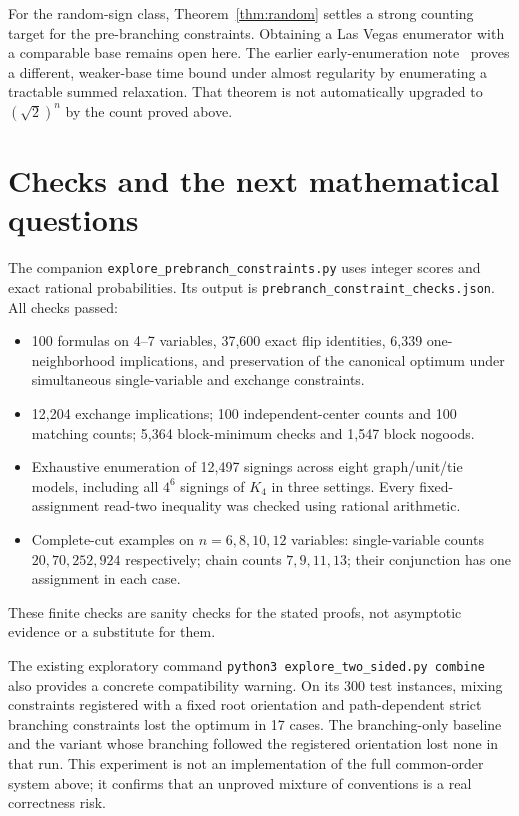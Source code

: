 \documentclass[11pt,a4paper]{article}
\theoremstyle{remark}
\begin{document}
For the random-sign class, Theorem~\ref{thm:random} settles a strong
counting target for the pre-branching constraints. Obtaining a Las Vegas
enumerator with a comparable base remains open here. The earlier
early-enumeration note~\cite{Early} proves a different, weaker-base time
bound under almost regularity by enumerating a tractable summed
relaxation. That theorem is not automatically upgraded to $(\sqrt2)^n$
by the count proved above.

\section{Checks and the next mathematical questions}

The companion \texttt{explore\_prebranch\_constraints.py} uses integer
scores and exact rational probabilities. Its output is
\texttt{prebranch\_constraint\_checks.json}. All checks passed:
\begin{itemize}
\item 100 formulas on 4--7 variables, 37,600 exact flip identities,
6,339 one-neighborhood implications, and preservation of the canonical
optimum under simultaneous single-variable and exchange constraints.
\item 12,204 exchange implications; 100 independent-center counts and
100 matching counts; 5,364 block-minimum checks and 1,547 block nogoods.
\item Exhaustive enumeration of 12,497 signings across eight graph/unit/tie
models, including all $4^6$ signings of $K_4$ in three settings. Every
fixed-assignment read-two inequality was checked using rational arithmetic.
\item Complete-cut examples on $n=6,8,10,12$ variables: single-variable
counts $20,70,252,924$ respectively; chain counts $7,9,11,13$;
their conjunction has one assignment in each case.
\end{itemize}
These finite checks are sanity checks for the stated proofs, not
asymptotic evidence or a substitute for them.

The existing exploratory command \texttt{python3 explore\_two\_sided.py combine}
also provides a concrete compatibility warning. On its 300 test instances,
mixing constraints registered with a fixed root orientation and
path-dependent strict branching constraints lost the optimum in 17 cases.
The branching-only baseline and the variant whose branching followed the
registered orientation lost none in that run. This experiment is not an
implementation of the full common-order system above; it confirms that
an unproved mixture of conventions is a real correctness risk.
\end{document}
